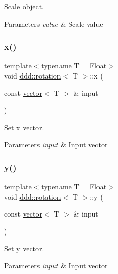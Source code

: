 Scale object. 


\begin{DoxyParams}{Parameters}
{\em value} & Scale value \\
\hline
\end{DoxyParams}
\mbox{\label{classddd_1_1rotation_ab1d32f426452f5fc28844c1c7ba486c6}} 
\subsubsection{\texorpdfstring{x()}{x()}}
{\footnotesize\ttfamily template$<$typename T  = Float$>$ \\
void \hyperlink{classddd_1_1rotation}{ddd\+::rotation}$<$ T $>$\+::x (\begin{DoxyParamCaption}\item[{const \hyperlink{classddd_1_1vector}{vector}$<$ T $>$ \&}]{input }\end{DoxyParamCaption})\hspace{0.3cm}{\ttfamily [inline]}}



Set x vector. 


\begin{DoxyParams}{Parameters}
{\em input} & Input vector \\
\hline
\end{DoxyParams}
\mbox{\label{classddd_1_1rotation_aeb1179a75b15819f424d212d9b09d818}} 
\subsubsection{\texorpdfstring{y()}{y()}}
{\footnotesize\ttfamily template$<$typename T  = Float$>$ \\
void \hyperlink{classddd_1_1rotation}{ddd\+::rotation}$<$ T $>$\+::y (\begin{DoxyParamCaption}\item[{const \hyperlink{classddd_1_1vector}{vector}$<$ T $>$ \&}]{input }\end{DoxyParamCaption})\hspace{0.3cm}{\ttfamily [inline]}}



Set y vector. 


\begin{DoxyParams}{Parameters}
{\em input} & Input vector \\
\hline
\end{DoxyParams}
\mbox{\label{classddd_1_1rotation_add5659b127f52c0796f8eaa5997d9e20}} 
